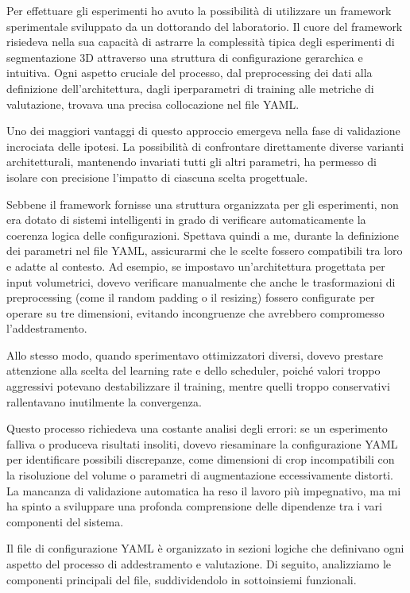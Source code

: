 
Per effettuare gli esperimenti ho avuto la possibilità di utilizzare un framework sperimentale sviluppato da un dottorando del laboratorio. Il cuore del framework risiedeva nella sua capacità di astrarre la complessità tipica degli esperimenti di segmentazione 3D attraverso una struttura di configurazione gerarchica e intuitiva. Ogni aspetto cruciale del processo, dal preprocessing dei dati alla definizione dell'architettura, dagli iperparametri di training alle metriche di valutazione, trovava una precisa collocazione nel file YAML.

Uno dei maggiori vantaggi di questo approccio emergeva nella fase di validazione incrociata delle ipotesi. La possibilità di confrontare direttamente diverse varianti architetturali, mantenendo invariati tutti gli altri parametri, ha permesso di isolare con precisione l'impatto di ciascuna scelta progettuale.


Sebbene il framework fornisse una struttura organizzata per gli esperimenti, non era dotato di sistemi intelligenti in grado di verificare automaticamente la coerenza logica delle configurazioni. Spettava quindi a me, durante la definizione dei parametri nel file YAML, assicurarmi che le scelte fossero compatibili tra loro e adatte al contesto. Ad esempio, se impostavo un'architettura progettata per input volumetrici, dovevo verificare manualmente che anche le trasformazioni di preprocessing (come il random padding o il resizing) fossero configurate per operare su tre dimensioni, evitando incongruenze che avrebbero compromesso l'addestramento. 


Allo stesso modo, quando sperimentavo ottimizzatori diversi, dovevo prestare attenzione alla scelta del learning rate e dello scheduler, poiché valori troppo aggressivi potevano destabilizzare il training, mentre quelli troppo conservativi rallentavano inutilmente la convergenza. 

Questo processo richiedeva una costante analisi degli errori: se un esperimento falliva o produceva risultati insoliti, dovevo riesaminare la configurazione YAML per identificare possibili discrepanze, come dimensioni di crop incompatibili con la risoluzione del volume o parametri di augmentazione eccessivamente distorti. La mancanza di validazione automatica ha reso il lavoro più impegnativo, ma mi ha spinto a sviluppare una profonda comprensione delle dipendenze tra i vari componenti del sistema.


Il file di configurazione YAML è organizzato in sezioni logiche che definivano ogni aspetto del processo di addestramento e valutazione. Di seguito, analizziamo le componenti principali del file, suddividendolo in sottoinsiemi funzionali.

